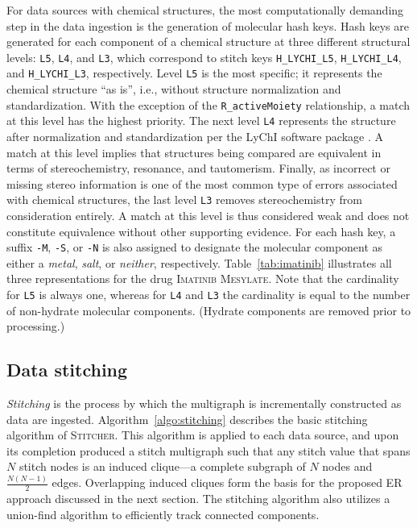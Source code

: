 \documentclass{bmcart}
\newcommand\st{\textsc{Stitcher}}
\begin{document}
For data sources with chemical structures, the most computationally
demanding step in the data ingestion is the generation of molecular hash
keys. Hash keys are generated for each component of a chemical
structure at three different structural levels: 
\texttt{L5}, \texttt{L4}, and \texttt{L3}, which correspond to
stitch keys \texttt{H\_LYCHI\_L5}, \texttt{H\_LYCHI\_L4},
and \texttt{H\_LYCHI\_L3}, respectively. Level \texttt{L5} is the most
specific; it represents the chemical structure ``as is'', i.e., without
structure normalization and standardization. With the exception of the
\texttt{R\_activeMoiety} relationship, a match at this level has the highest
priority. The next level \texttt{L4} represents the structure after 
normalization and standardization per the LyChI software package \cite{lychi}. 
A match at this level implies that structures being compared are equivalent 
in terms of stereochemistry, resonance, and tautomerism. Finally, as incorrect 
or missing stereo information is one of the most common type of errors 
associated with chemical structures, the last level \texttt{L3} removes 
stereochemistry from consideration entirely. A match at this level is thus 
considered weak and does not constitute equivalence without other supporting evidence.
For each hash key, a suffix \texttt{-M}, \texttt{-S}, or \texttt{-N} is also assigned to
designate the molecular component as either
a \emph{metal}, \emph{salt}, or \emph{neither}, respectively.
Table~\ref{tab:imatinib} illustrates all three representations for the
drug \textsc{Imatinib Mesylate}. Note that the cardinality
for \texttt{L5} is always one, whereas for \texttt{L4} and \texttt{L3}
the cardinality is equal to the number of non-hydrate molecular
components. (Hydrate components are removed prior to processing.) 

\subsection*{Data stitching}
\emph{Stitching} is the process by which the multigraph is incrementally constructed 
as data are ingested. Algorithm~\ref{algo:stitching} describes the basic stitching algorithm
of \st. This algorithm is applied to each data source, and upon its
completion produced a stitch multigraph such that any stitch value
that spans $N$ stitch nodes is an induced clique---a complete
subgraph of $N$ nodes and $\frac{N(N-1)}{2}$ edges. Overlapping
induced cliques form the basis for the proposed ER approach discussed 
in the next section. The stitching algorithm also utilizes a union-find
algorithm \cite{Cormen2001} to efficiently track connected components. 
\end{document}
